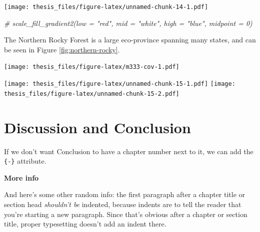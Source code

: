 \documentclass[12pt,twoside]{reedthesis}
\newenvironment{Shaded}{\begin{snugshade}}{\end{snugshade}}
\newcommand{\CommentTok}[1]{\textcolor[rgb]{0.56,0.35,0.01}{\textit{#1}}}
\newcommand{\DataTypeTok}[1]{\textcolor[rgb]{0.13,0.29,0.53}{#1}}
\newcommand{\KeywordTok}[1]{\textcolor[rgb]{0.13,0.29,0.53}{\textbf{#1}}}
\newcommand{\NormalTok}[1]{#1}
\newcommand{\OperatorTok}[1]{\textcolor[rgb]{0.81,0.36,0.00}{\textbf{#1}}}
\newcommand{\StringTok}[1]{\textcolor[rgb]{0.31,0.60,0.02}{#1}}
\begin{document}
\begin{Shaded}
\end{Shaded}
\texttt{[image: thesis\_files/figure-latex/unnamed-chunk-14-1.pdf]}
\begin{Shaded}
\begin{Highlighting}[]
  \CommentTok{# scale_fill_gradient2(low = "red", mid = "white", high = "blue", midpoint = 0)}
\end{Highlighting}
\end{Shaded}
The Northern Rocky Forest is a large eco-province spanning many states, and can be seen in Figure \ref{fig:northern-rocky}.

\texttt{[image: thesis\_files/figure-latex/m333-cov-1.pdf]}

\texttt{[image: thesis\_files/figure-latex/unnamed-chunk-15-1.pdf]} \texttt{[image: thesis\_files/figure-latex/unnamed-chunk-15-2.pdf]}

\hypertarget{discussion-and-conclusion}{%
\chapter{Discussion and Conclusion}\label{discussion-and-conclusion}}

If we don't want Conclusion to have a chapter number next to it, we can add the \texttt{\{-\}} attribute.

\textbf{More info}

And here's some other random info: the first paragraph after a chapter title or section head \emph{shouldn't be} indented, because indents are to tell the reader that you're starting a new paragraph. Since that's obvious after a chapter or section title, proper typesetting doesn't add an indent there.
\end{document}
